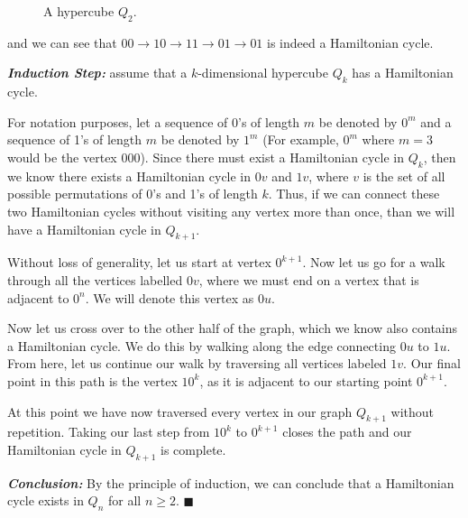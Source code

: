 \documentclass[11pt, oneside]{article}   	%
\newcommand*{\QEDA}{\hfill\ensuremath{\blacksquare}}         %
\begin{document}
{{\begin{figure}[h]
            \caption{A hypercube $Q_2$.}
            \label{Q2}
          \end{figure}
          
          and we can see that $00 \rightarrow 10 \rightarrow 11 \rightarrow 01 \rightarrow 01$ is indeed a Hamiltonian cycle.
	
	\textit{\textbf{Induction Step:}} assume that a $k$-dimensional hypercube $Q_{k}$ has a Hamiltonian cycle.
	
	 For notation purposes, let a sequence of 0's of length $m$ be denoted by $0^m$ and a sequence of 1's of length $m$ be denoted by $1^m$ (For example, $0^m$ where $m=3$ would be the vertex 000). Since there must exist a Hamiltonian cycle in $Q_k$, then we know there exists a Hamiltonian cycle in $0v$ and $1v$, where $v$ is the set of all possible permutations of 0's and 1's of length $k$. Thus, if we can connect these two Hamiltonian cycles without visiting any vertex more than once, than we will have a Hamiltonian cycle in $Q_{k+1}$.
	
	 Without loss of generality, let us start at vertex $0^{k+1}$. Now let us go for a walk through all the vertices labelled $0v$, where we must end on a vertex that is adjacent to $0^n$. We will denote this vertex as $0u$.
	
	Now let us cross over to the other half of the graph, which we know also contains a Hamiltonian cycle. We do this by walking along the edge connecting $0u$ to $1u$. From here, let us continue our walk by traversing all vertices labeled $1v$. Our final point in this path is the vertex $10^{k}$, as it is adjacent to our starting point $0^{k+1}$.
	
	At this point we have now traversed every vertex in our graph $Q_{k+1}$ without repetition. Taking our last step from $10^{k}$ to $0^{k+1}$ closes the path and our Hamiltonian cycle in $Q_{k+1}$ is complete.
	
	\textit{\textbf{Conclusion:}} By the principle of induction, we can conclude that a Hamiltonian cycle exists in $Q_n$ for all $n \geq 2$. \QEDA
	
	
	\begin{figure}[h]
            \centering
            
\end{figure}}}
\end{document}
